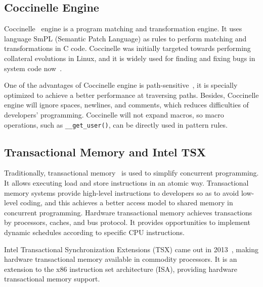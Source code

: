 \documentclass[10pt]{llncs}
\begin{document}
\subsection{Coccinelle Engine}
\label{back2}

Coccinelle~\cite{Jones2007The,Stuart2008Hunting} engine is a program matching and transformation engine. It uses language SmPL (Semantic Patch Language) as rules to perform matching and transformations in C code. Coccinelle was initially targeted towards performing collateral evolutions in Linux, and it is widely used for finding and fixing bugs in system code now~\cite{lawall2010finding}.

One of the advantages of Coccinelle engine is path-sensitive~\cite{Jones2007The}, it is specially optimized to achieve a better performance at traversing paths. Besides, Coccinelle engine will ignore spaces, newlines, and comments, which reduces difficulties of developers' programming. Coccinelle will not expand macros, so macro operations, such as \verb:__get_user():, can be directly used in pattern rules.

\subsection{Transactional Memory and Intel TSX}
\label{back3}
Traditionally, transactional memory~\cite{Herlihy1993Transactional,Harris2010Transactional,Hammond2004Transactional,Karnagel2014Improving} is used to simplify concurrent programming. It allows executing load and store instructions in an atomic way. Transactional memory systems provide high-level instructions to developers so as to avoid low-level coding, and this achieves a better access model to shared memory in concurrent programming. Hardware transactional memory achieves transactions by processors, caches, and bus protocol. It provides opportunities to implement dynamic schedules according to specific CPU instructions.

Intel Transactional Synchronization Extensions (TSX) came out in 2013~\cite{Yoo2014Performance,Haas2014Enhancing,Goel2014Performance}, making hardware transactional memory available in commodity processors. It is an extension to the x86 instruction set architecture (ISA), providing hardware transactional memory support.
\end{document}

